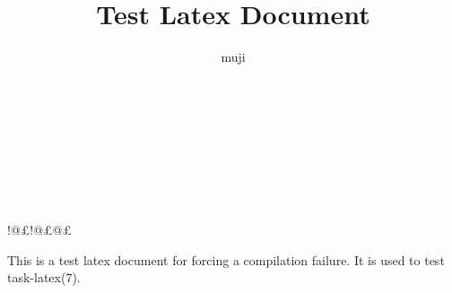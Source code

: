 \documentclass[a4paper,oneside,twocolumns]{article}
\title{Test Latex Document}
\author{muji}
\renewcommand{\paragraph}{\large}
\begin{document}
\fancyhead{}
\fancyfoot{}

\lfoot{\thepage}

\clearpage

\\\\\\\\\\\\\sfsdfsdf!@£!@£@£%

%
%

\paragraph{\normalsize{This is a test latex document for forcing a compilation failure. It is used to test task-latex(7).}}
\end{document}
